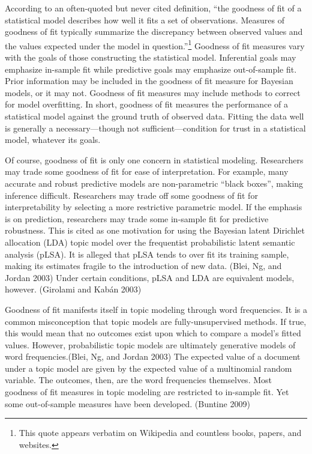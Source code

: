 \documentclass[conference,final,]{IEEEtran}
\begin{document}
According to an often-quoted but never cited definition, ``the goodness
of fit of a statistical model describes how well it fits a set of
observations. Measures of goodness of fit typically summarize the
discrepancy between observed values and the values expected under the
model in question.''\footnote{This quote appears verbatim on Wikipedia
  and countless books, papers, and websites.} Goodness of fit measures
vary with the goals of those constructing the statistical model.
Inferential goals may emphasize in-sample fit while predictive goals may
emphasize out-of-sample fit. Prior information may be included in the
goodness of fit measure for Bayesian models, or it may not. Goodness of
fit measures may include methods to correct for model overfitting. In
short, goodness of fit measures the performance of a statistical model
against the ground truth of observed data. Fitting the data well is
generally a necessary---though not sufficient---condition for trust in a
statistical model, whatever its goals.

Of course, goodness of fit is only one concern in statistical modeling.
Researchers may trade some goodness of fit for ease of interpretation.
For example, many accurate and robust predictive models are
non-parametric ``black boxes'', making inference difficult. Researchers
may trade off some goodness of fit for interpretability by selecting a
more restrictive parametric model. If the emphasis is on prediction,
researchers may trade some in-sample fit for predictive robustness. This
is cited as one motivation for using the Bayesian latent Dirichlet
allocation (LDA) topic model over the frequentist probabilistic latent
semantic analysis (pLSA). It is alleged that pLSA tends to over fit its
training sample, making its estimates fragile to the introduction of new
data. (Blei, Ng, and Jordan 2003) Under certain conditions, pLSA and LDA
are equivalent models, however. (Girolami and Kabán 2003)

Goodness of fit manifests itself in topic modeling through word
frequencies. It is a common misconception that topic models are
fully-unsupervised methods. If true, this would mean that no outcomes
exist upon which to compare a model's fitted values. However,
probabilistic topic models are ultimately generative models of word
frequencies.(Blei, Ng, and Jordan 2003) The expected value of a document
under a topic model are given by the expected value of a multinomial
random variable. The outcomes, then, are the word frequencies
themselves. Most goodness of fit measures in topic modeling are
restricted to in-sample fit. Yet some out-of-sample measures have been
developed. (Buntine 2009)
\end{document}
